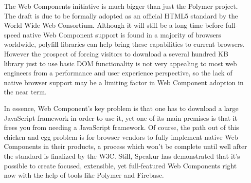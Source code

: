 The Web Components initiative is much bigger than just the Polymer project.
The draft is due to be formally adopted as an official HTML5 standard by the World Wide Web Consortium.
Although it will still be a long time before full-speed native Web Component support is found in a majority of browsers worldwide, 
polyfill libraries can help bring these capabilities to current browsers.
However the prospect of forcing visitors to download a several hundred KB library just to use basic DOM functionality is not very appealing to most web engineers from a performance and user experience perspective, 
so the lack of native browser support may be a limiting factor in Web Component adoption in the near term.

In essence, Web Component's key problem is that one has to download a large JavaScript framework in order to use it, 
yet one of its main premises is that it frees you from needing a JavaScript framework.
Of course, the path out of this chicken-and-egg problem is for browser vendors to fully implement native Web Components in their products,
a process which won't be complete until well after the standard is finalized by the W3C.
Still, Speakur has demonstrated that it's possible to create focused, extensible, yet full-featured Web Components right now with the help of tools like Polymer and Firebase.